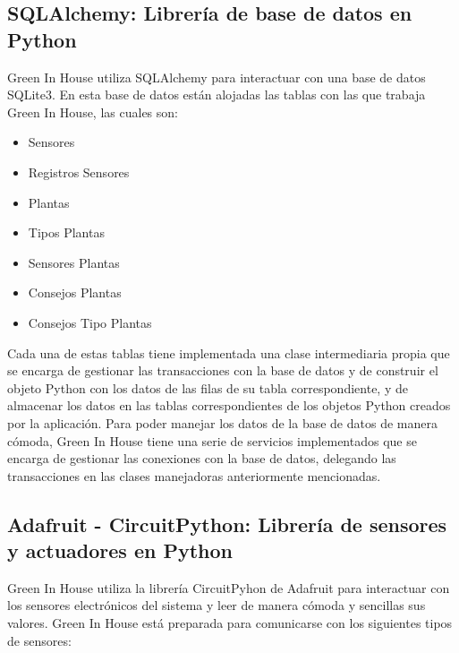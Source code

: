     \subsection{SQLAlchemy: Librería de base de datos en Python}
    Green In House utiliza SQLAlchemy \cite{wiki:sqlalchemy} para interactuar con una base de datos SQLite3. En esta base de datos están alojadas las tablas con las que trabaja Green In House, las cuales son:
    \begin{itemize}
        \item Sensores
        \item Registros Sensores
        \item Plantas
        \item Tipos Plantas
        \item Sensores Plantas
        \item Consejos Plantas
        \item Consejos Tipo Plantas
    \end{itemize}
    Cada una de estas tablas tiene implementada una clase intermediaria propia que se encarga de gestionar las transacciones con la base de datos y de construir el objeto Python con los datos de las filas de su tabla correspondiente, y de almacenar los datos en las tablas correspondientes de los objetos Python creados por la aplicación. 
    Para poder manejar los datos de la base de datos de manera cómoda, Green In House tiene una serie de servicios implementados que se encarga de gestionar las conexiones con la base de datos, delegando las transacciones en las clases manejadoras anteriormente mencionadas.

    \subsection{Adafruit - CircuitPython: Librería de sensores y actuadores en Python}
    Green In House utiliza la librería CircuitPyhon de Adafruit \cite{wiki:adafruit_circuit_Python} para interactuar con los sensores electrónicos del sistema y leer de manera cómoda y sencillas sus valores. Green In House está preparada para comunicarse con los siguientes tipos de sensores:
